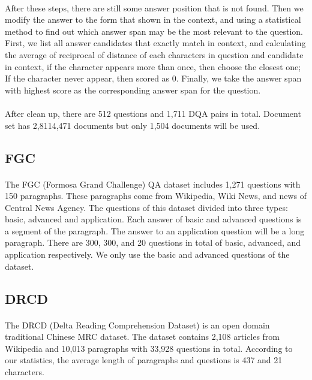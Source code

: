 \documentclass{article}
\begin{document}
\paragraph{}
After these steps, there are still some answer position that is not found. Then we modify the answer to the form that shown in the context, and using a statistical method to find out which answer span may be the most relevant to the question. First, we list all answer candidates that exactly match in context, and calculating the average of reciprocal of distance of each characters in question and candidate in context, if the character appears more than once, then choose the closest one; If the character never appear, then scored as 0. Finally, we take the answer span with highest score as the corresponding answer span for the question.

\paragraph{}
After clean up, there are 512 questions and 1,711 DQA pairs in total. Document set has 2,8114,471 documents but only 1,504 documents will be used.

\subsection{FGC}
\paragraph{}
The FGC (Formosa Grand Challenge) QA dataset includes 1,271 questions with 150 paragraphs. These paragraphs come from Wikipedia, Wiki News, and news of Central News Agency. The questions of this dataset divided into three types: basic, advanced and application. Each answer of basic and advanced questions is a segment of the paragraph. The answer to an application question will be a long paragraph. There are 300, 300, and 20 questions in total of basic, advanced, and application respectively. We only use the basic and advanced questions of the dataset.

\subsection{DRCD}
\paragraph{}
The DRCD\cite{shao2018drcd} (Delta Reading Comprehension Dataset) is an open domain traditional Chinese MRC dataset. The dataset contains 2,108 articles from Wikipedia and 10,013 paragraphs with 33,928 questions in total. According to our statistics, the average length of paragraphs and questions is 437 and 21 characters.
\end{document}
